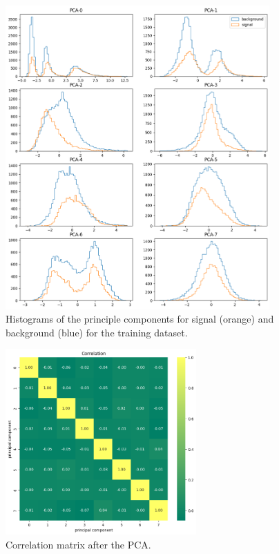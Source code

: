 \begin{figure}
    \centering
    \includegraphics[width=0.9\textwidth]{img/Pasted image 20240805115045.png}
    \caption{Histograms of the principle components for signal (orange) and background (blue) for the training dataset.}
    \label{fig:hists-pca}
\end{figure}


\begin{figure}
    \centering
    \includegraphics[width=0.65\textwidth]{img/Pasted image 20240805120402.png}
    \caption{Correlation matrix after the PCA.}
    \label{fig:corrmatrix}
\end{figure}


